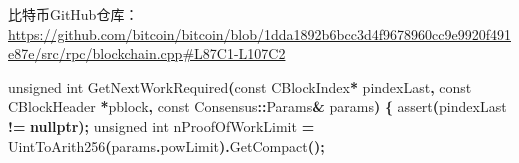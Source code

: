 \documentclass[
]{article}
\newenvironment{Shaded}{\begin{snugshade}}{\end{snugshade}}
\newcommand{\AttributeTok}[1]{\textcolor[rgb]{0.13,0.29,0.53}{#1}}
\newcommand{\DataTypeTok}[1]{\textcolor[rgb]{0.13,0.29,0.53}{#1}}
\newcommand{\KeywordTok}[1]{\textcolor[rgb]{0.13,0.29,0.53}{\textbf{#1}}}
\newcommand{\NormalTok}[1]{#1}
\newcommand{\OperatorTok}[1]{\textcolor[rgb]{0.81,0.36,0.00}{\textbf{#1}}}
\newcommand{\OtherTok}[1]{\textcolor[rgb]{0.56,0.35,0.01}{#1}}
\begin{document}
比特币GitHub仓库：\url{https://github.com/bitcoin/bitcoin/blob/1dda1892b6bcc3d4f9678960cc9e9920f491e87e/src/rpc/blockchain.cpp\#L87C1-L107C2}

\begin{Shaded}
\begin{Highlighting}[numbers=left,,]
\DataTypeTok{unsigned} \DataTypeTok{int}\NormalTok{ GetNextWorkRequired}\OperatorTok{(}\AttributeTok{const}\NormalTok{ CBlockIndex}\OperatorTok{*}\NormalTok{ pindexLast}\OperatorTok{,} \AttributeTok{const}\NormalTok{ CBlockHeader }\OperatorTok{*}\NormalTok{pblock}\OperatorTok{,} 
  \AttributeTok{const}\NormalTok{ Consensus}\OperatorTok{::}\NormalTok{Params}\OperatorTok{\&}\NormalTok{ params}\OperatorTok{)}
\OperatorTok{\{}
    \OtherTok{assert}\OperatorTok{(}\NormalTok{pindexLast }\OperatorTok{!=} \KeywordTok{nullptr}\OperatorTok{);}
    \DataTypeTok{unsigned} \DataTypeTok{int}\NormalTok{ nProofOfWorkLimit }\OperatorTok{=}\NormalTok{ UintToArith256}\OperatorTok{(}\NormalTok{params}\OperatorTok{.}\NormalTok{powLimit}\OperatorTok{).}\NormalTok{GetCompact}\OperatorTok{();}


\end{Highlighting}
\end{Shaded}
\end{document}
